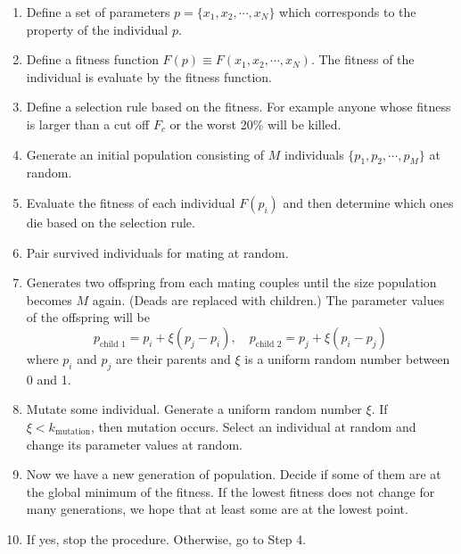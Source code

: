 \bigskip
\begin{myalgobox}
\label{algo:ga}

\medskip
\begin{minipage}{5.5in}
\small
\begin{enumerate}
\item Define a set of parameters  $p=\{x_1, x_2, \cdots, x_N\}$ which corresponds to the property of the individual $p$.
\item Define a fitness function $F(p) \equiv F(x_1, x_2, \cdots, x_N)$.  The fitness of the individual is evaluate by the fitness function.
\item Define a selection rule based on the fitness.  For example anyone whose fitness is larger than a cut off $F_c$ or the worst 20\% will be killed.
\item Generate an initial population consisting of $M$ individuals $\{p_1, p_2, \cdots, p_M\}$ at random.
\item Evaluate the fitness of each individual $F(p_i)$ and then determine which ones die based on the selection rule.
\item Pair survived individuals for mating at random.
\item Generates two offspring from each mating couples until the size population becomes $M$ again. (Deads are replaced with children.) The parameter values of the offspring will be
\[
p_\text{child 1} = p_i + \xi (p_j-p_i), \quad p_\text{child 2} = p_j + \xi (p_i-p_j)
\]
where $p_i$ and $p_j$ are their parents and $\xi$ is a uniform random number between 0 and 1.
\item Mutate some individual. Generate a uniform random number $\xi$. If $\xi < k_\text{mutation}$, then mutation occurs. Select an individual at random and change its parameter values at random.
\item Now we have a new generation of population.  Decide if some of them are at the global minimum of the fitness. If the lowest fitness does not change for many generations, we hope that at least some are at the lowest point.
\item If yes, stop the procedure. Otherwise, go to Step 4.
\end{enumerate}
\end{minipage}
\normalsize
\end{myalgobox}


